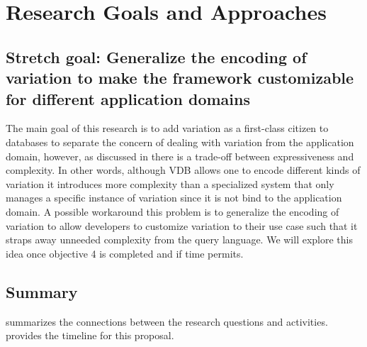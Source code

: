 \section{Research Goals and Approaches}
\label{sec:goals}







\subsection{Stretch goal: Generalize the encoding of variation to make the framework
customizable for different application domains}
\label{sec:ro5}

The main goal of this research is to add variation as a first-class citizen to 
databases to separate the concern of dealing with variation from the application
domain, however, as discussed in  there is a trade-off between 
 expressiveness and complexity. In other words, although VDB allows 
one to encode different kinds of variation it introduces more complexity than a
specialized system that only manages a specific instance of variation
since it is not bind to the application domain. 
A possible workaround this problem is to generalize the encoding of
variation to allow developers to customize variation to their use case such 
that it straps away unneeded complexity from the query language. We will 
explore this idea once objective 4 is completed and if time permits. 

\subsection{Summary}
\label{sec:sum}

 summarizes the connections between the research questions and activities.
 provides the timeline for this proposal.


\begin{figure}
\label{fig:conn}
\end{figure}

